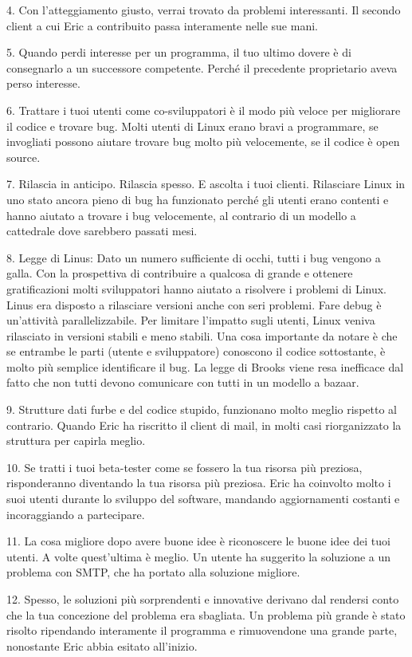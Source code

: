 \documentclass[a4paper,12pt,titlepage,oneside]{book}
\begin{document}
4. Con l'atteggiamento giusto, verrai trovato da problemi interessanti.
Il secondo client a cui Eric a contribuito passa interamente nelle sue mani.

5. Quando perdi interesse per un programma, il tuo ultimo dovere è di consegnarlo a un successore competente.
Perché il precedente proprietario aveva perso interesse.

6. Trattare i tuoi utenti come co-sviluppatori è il modo più veloce per migliorare il codice e trovare bug.
Molti utenti di Linux erano bravi a programmare, se invogliati possono aiutare trovare bug molto più velocemente, se il codice è open source. 

7. Rilascia in anticipo. Rilascia spesso. E ascolta i tuoi clienti.
Rilasciare Linux in uno stato ancora pieno di bug ha funzionato perché gli utenti erano contenti e hanno aiutato a trovare i bug velocemente, al contrario di un modello a cattedrale dove sarebbero passati mesi.

8. Legge di Linus: Dato un numero sufficiente di occhi, tutti i bug vengono a galla.
Con la prospettiva di contribuire a qualcosa di grande e ottenere gratificazioni molti sviluppatori hanno aiutato a risolvere i problemi di Linux. Linus era disposto a rilasciare versioni anche con seri problemi.
Fare debug è un'attività parallelizzabile.
Per limitare l'impatto sugli utenti, Linux veniva rilasciato in versioni stabili e meno stabili.
Una cosa importante da notare è che se entrambe le parti (utente e sviluppatore) conoscono il codice sottostante, è molto più semplice identificare il bug.
La legge di Brooks viene resa inefficace dal fatto che non tutti devono comunicare con tutti in un modello a bazaar.

9. Strutture dati furbe e del codice stupido, funzionano molto meglio rispetto al contrario.
Quando Eric ha riscritto il client di mail, in molti casi riorganizzato la struttura per capirla meglio.

10. Se tratti i tuoi beta-tester come se fossero la tua risorsa più preziosa, risponderanno diventando la tua risorsa più preziosa.
Eric ha coinvolto molto i suoi utenti durante lo sviluppo del software, mandando aggiornamenti costanti e incoraggiando a partecipare.

11. La cosa migliore dopo avere buone idee è riconoscere le buone idee dei tuoi utenti. A volte quest'ultima è meglio.
Un utente ha suggerito la soluzione a un problema con SMTP, che ha portato alla soluzione migliore.

12. Spesso, le soluzioni più sorprendenti e innovative derivano dal rendersi conto che la tua concezione del problema era sbagliata.
Un problema più grande è stato risolto ripendando interamente il programma e rimuovendone una grande parte, nonostante Eric abbia esitato all'inizio.
\end{document}
